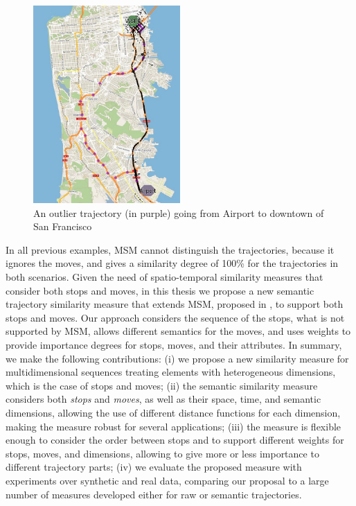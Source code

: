 \begin{figure}[h]
\centering
\includegraphics[width=0.5\textwidth]{Images/CRAWDAD-Outlier.jpg}
\caption{\label{fig:crawdad_outlier} An outlier trajectory (in purple) going from Airport to downtown of San Francisco}
\end{figure}

In all previous examples, MSM cannot distinguish the trajectories, because it ignores the moves, and gives a similarity degree of 100\% for the trajectories in both scenarios.
Given the need of spatio-temporal similarity measures that consider both stops and moves, in this thesis we propose a new semantic trajectory similarity measure that extends MSM, proposed in \cite{Furtado:TGIS12156}, to support both stops and moves. Our approach considers the sequence of the stops, what is not supported by MSM, allows different semantics for the moves, and uses weights to provide importance degrees for stops, moves, and their attributes. 
In summary, we make the following contributions:
(i) we propose a new similarity measure for multidimensional sequences treating elements with heterogeneous dimensions, which is the case of stops and moves; (ii) the semantic similarity measure considers both \textit{stops} and \textit{moves}, as well as their space, time, and semantic dimensions, allowing the use of different distance functions for each dimension, making the measure robust for several applications; (iii) the measure is flexible enough to consider the order between stops and to support different weights for stops, moves, and dimensions, allowing to give more or less importance to different trajectory parts; (iv) we evaluate the proposed measure with experiments over synthetic and real data, comparing our proposal to a large number of measures developed either for raw or semantic trajectories.

